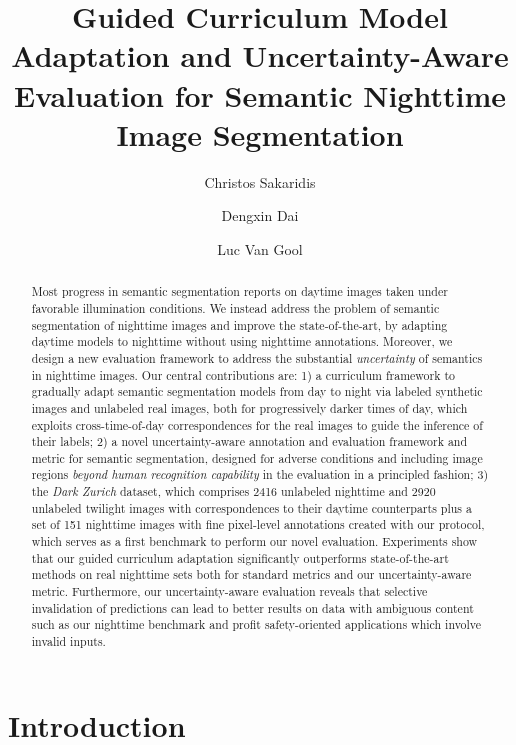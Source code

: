 \documentclass[10pt,twocolumn,letterpaper]{article}
\begin{document}
\title{Guided Curriculum Model Adaptation and Uncertainty-Aware Evaluation for Semantic Nighttime Image Segmentation}

\author[1]{Christos Sakaridis}
\author[1]{Dengxin Dai}
\author[1,2]{Luc Van Gool}


\maketitle


\begin{abstract}
Most progress in semantic segmentation reports on daytime images taken under favorable illumination conditions. We instead address the problem of semantic segmentation of nighttime images and improve the state-of-the-art, by adapting daytime models to nighttime without using nighttime annotations. Moreover, we design a new evaluation framework to address the substantial \emph{uncertainty} of semantics in nighttime images. Our central contributions are: 1) a curriculum framework to gradually adapt semantic segmentation models from day to night via labeled synthetic images and unlabeled real images, both for progressively darker times of day, which exploits cross-time-of-day correspondences for the real images to guide the inference of their labels; 2) a novel uncertainty-aware annotation and evaluation framework and metric for semantic segmentation, designed for adverse conditions and including image regions \emph{beyond human recognition capability} in the evaluation in a principled fashion; 3) the \emph{Dark Zurich} dataset, which comprises 2416 unlabeled nighttime and 2920 unlabeled twilight images with correspondences to their daytime counterparts plus a set of 151 nighttime images with fine pixel-level annotations created with our protocol, which serves as a first benchmark to perform our novel evaluation. Experiments show that our guided curriculum adaptation significantly outperforms state-of-the-art methods on real nighttime sets both for standard metrics and our uncertainty-aware metric. Furthermore, our uncertainty-aware evaluation reveals that selective invalidation of predictions can lead to better results on data with ambiguous content such as our nighttime benchmark and profit safety-oriented applications which involve invalid inputs.
\end{abstract}

\section{Introduction}
\label{sec:intro}
\end{document}
